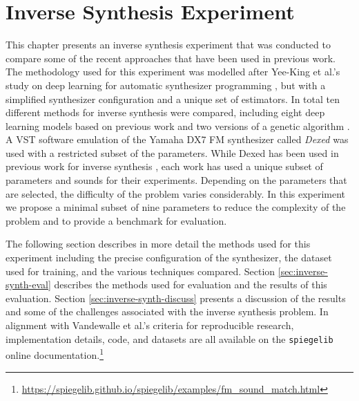\chapter{Inverse Synthesis Experiment}
\label{chapter:inverse_synth_experiment}

This chapter presents an inverse synthesis experiment that was conducted to compare some of the recent approaches that have been used in previous work. The methodology used for this experiment was modelled after Yee-King et al.'s study on deep learning for automatic synthesizer programming \cite{yee2018automatic}, but with a simplified synthesizer configuration and a unique set of estimators. In total ten different methods for inverse synthesis were compared, including eight deep learning models based on previous work \cite{barkan2019inversynth, yee2018automatic} and two versions of a genetic algorithm \cite{horner1993machine, tatar2016automatic}. A VST software emulation of the Yamaha DX7 FM synthesizer called \textit{Dexed} was used with a restricted subset of the parameters. While Dexed has been used in previous work for inverse synthesis \cite{yee2018automatic, luke2019stochastic, le2021improving, masudo2021quality}, each work has used a unique subset of parameters and sounds for their experiments. Depending on the parameters that are selected, the difficulty of the problem varies considerably. In this experiment we propose a minimal subset of nine parameters to reduce the complexity of the problem and to provide a benchmark for evaluation.

The following section describes in more detail the methods used for this experiment including the precise configuration of the synthesizer, the dataset used for training, and the various techniques compared. Section \ref{sec:inverse-synth-eval} describes the methods used for evaluation and the results of this evaluation. Section \ref{sec:inverse-synth-discuss} presents a discussion of the results and some of the challenges associated with the inverse synthesis problem. In alignment with Vandewalle et al.'s criteria for reproducible research, implementation details, code, and datasets are all available on the \texttt{spiegelib} online documentation.\footnote{\url{https://spiegelib.github.io/spiegelib/examples/fm_sound_match.html}}

